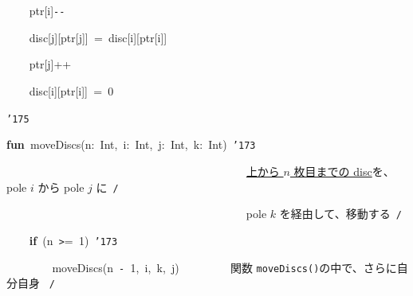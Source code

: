 \documentclass[a4paper,10pt]{article}
\def\mc{\relax}
\begin{document}
\noindent
\mbox{}{\tt\mc \ }{\tt\mc \ }{\tt\mc \ }{\tt\mc \ }ptr[i]{\tt -}{\tt -}

\noindent
\mbox{}{\tt\mc \ }{\tt\mc \ }{\tt\mc \ }{\tt\mc \ }disc[j][ptr[j]]{\tt\mc \ }={\tt\mc \ }disc[i][ptr[i]]

\noindent
\mbox{}{\tt\mc \ }{\tt\mc \ }{\tt\mc \ }{\tt\mc \ }ptr[j]++

\noindent
\mbox{}{\tt\mc \ }{\tt\mc \ }{\tt\mc \ }{\tt\mc \ }disc[i][ptr[i]]{\tt\mc \ }={\tt\mc \ }0

\noindent
\mbox{}{\tt\char'175}

\noindent
\mbox{}\hfill

\noindent
\mbox{}\textbf{fun}{\tt\mc \ }moveDiscs(n:{\tt\mc \ }Int,{\tt\mc \ }i:{\tt\mc \ }Int,{\tt\mc \ }j:{\tt\mc \ }Int,{\tt\mc \ }k:{\tt\mc \ }Int){\tt\mc \ }{\tt\char'173}

\noindent
\mbox{}{\tt\mc \ }{\tt\mc \ }{\tt\mc \ }{\tt\mc \ }{\tt\mc \ }{\tt\mc \ }{\tt\mc \ }{\tt\mc \ }{\tt\mc \ }{\tt\mc \ }{\tt\mc \ }{\tt\mc \ }{\tt\mc \ }{\tt\mc \ }{\tt\mc \ }{\tt\mc \ }{\tt\mc \ }{\tt\mc \ }{\tt\mc \ }{\tt\mc \ }{\tt\mc \ }{\tt\mc \ }{\tt\mc \ }{\tt\mc \ }{\tt\mc \ }{\tt\mc \ }{\tt\mc \ }{\tt\mc \ }{\tt\mc \ }{\tt\mc \ }{\tt\mc \ }{\tt\mc \ }{\tt\mc \ }{\tt\mc \ }{\tt\mc \ }{\tt\mc \ }{\tt\mc \ }{\tt\mc \ }{\tt\mc \ }{\tt\mc \ }\rm\mc {\tt /}{\tt *}\  \ \underline{\textsf{上から $n$ 枚目までの disc}}を、pole $i$ から pole $j$ に\hfill \rm\mc \ {\tt *}{\tt /}
\tt\mc 

\noindent
\mbox{}{\tt\mc \ }{\tt\mc \ }{\tt\mc \ }{\tt\mc \ }{\tt\mc \ }{\tt\mc \ }{\tt\mc \ }{\tt\mc \ }{\tt\mc \ }{\tt\mc \ }{\tt\mc \ }{\tt\mc \ }{\tt\mc \ }{\tt\mc \ }{\tt\mc \ }{\tt\mc \ }{\tt\mc \ }{\tt\mc \ }{\tt\mc \ }{\tt\mc \ }{\tt\mc \ }{\tt\mc \ }{\tt\mc \ }{\tt\mc \ }{\tt\mc \ }{\tt\mc \ }{\tt\mc \ }{\tt\mc \ }{\tt\mc \ }{\tt\mc \ }{\tt\mc \ }{\tt\mc \ }{\tt\mc \ }{\tt\mc \ }{\tt\mc \ }{\tt\mc \ }{\tt\mc \ }{\tt\mc \ }{\tt\mc \ }{\tt\mc \ }\rm\mc {\tt /}{\tt *}\  \ pole $k$ を経由して、移動する\hfill \rm\mc \ {\tt *}{\tt /}
\tt\mc 

\noindent
\mbox{}{\tt\mc \ }{\tt\mc \ }{\tt\mc \ }{\tt\mc \ }\textbf{if}{\tt\mc \ }(n{\tt\mc \ }{\tt >}={\tt\mc \ }1){\tt\mc \ }{\tt\char'173}

\noindent
\mbox{}{\tt\mc \ }{\tt\mc \ }{\tt\mc \ }{\tt\mc \ }{\tt\mc \ }{\tt\mc \ }{\tt\mc \ }{\tt\mc \ }moveDiscs(n{\tt\mc \ }{\tt -}{\tt\mc \ }1,{\tt\mc \ }i,{\tt\mc \ }k,{\tt\mc \ }j){\tt\mc \ }{\tt\mc \ }{\tt\mc \ }{\tt\mc \ }{\tt\mc \ }{\tt\mc \ }{\tt\mc \ }\rm\mc {\tt /}{\tt *}\  \ 関数 {\tt moveDiscs()}の中で、さらに自分自身 \hfill \rm\mc \ {\tt *}{\tt /}
\tt\mc 
\end{document}
